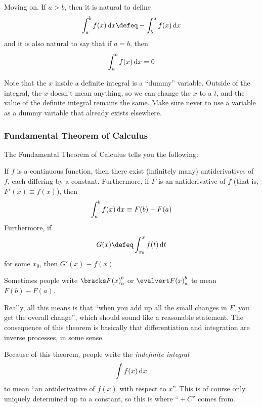 Moving on. If \(a > b\), then it is natural to define
\begin{equation*}
 \integ[a]<b>{f(x)}{x} \defeq -\integ[b]<a>{f(x)}{x}
\end{equation*}
and it is also natural to say that if \(a = b\), then
\begin{equation*}
 \integ[a]<b>{f(x)}{x} = 0
\end{equation*}

Note that the \(x\) inside a definite integral is a ``dummy'' variable. Outside
of the integral, the \(x\) doesn't mean anything, so we can change the \(x\) to
a \(t\), and the value of the definite integral remains the same. Make sure
never to use a variable as a dummy variable that already exists elsewhere.

\subsubsection{Fundamental Theorem of Calculus}

The Fundamental Theorem of Calculus tells you the following:
\begin{tcolorbox}
 If \(f\) is a continuous function, then there exist (infinitely many)
 antiderivatives of \(f\), each differing by a constant. Furthermore, if \(F\)
 is an antiderivative of \(f\) (that is, \(F'(x) \equiv f(x)\)), then
 \begin{equation*}
  \integ[a]<b>{f(x)}{x} \equiv F(b) - F(a)
 \end{equation*}
 Furthermore, if
 \begin{equation*}
  G(x) \defeq \integ[x_0]<x>{f(t)}{t}
 \end{equation*}
 for some \(x_0\), then \(G'(x) \equiv f(x)\)
\end{tcolorbox}
Sometimes people write \(\eval{a}{b}{F(x)}\) or \(\evalline{a}{b}{F(x)}\) to
mean \(F(b) - F(a)\).

Really, all this means is that ``when you add up all the small changes in
\(F\), you get the overall change'', which should sound like a reasonable
statement. The consequence of this theorem is basically that differentiation and
integration are inverse processes, in some sense.

Because of this theorem, people write the \emph{indefinite integral}
\begin{equation*}
 \integ{f(x)}{x}
\end{equation*}
to mean ``an antiderivative of \(f(x)\) with respect to \(x\)''. This is of
course only uniquely determined up to a constant, so this is where ``\({}+ C\)''
comes from.

